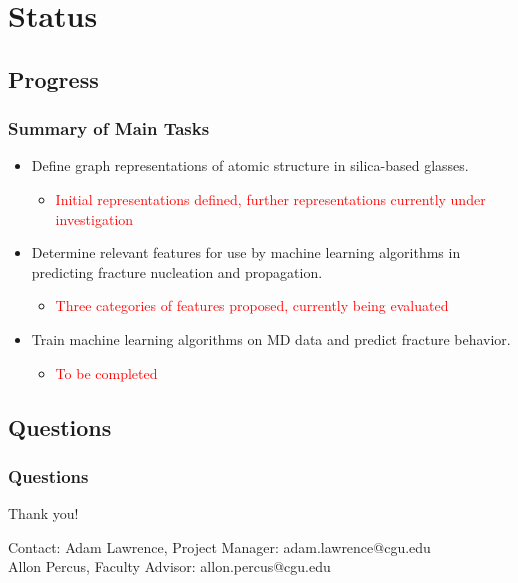 \section{Status}

\subsection{Progress}

\frame
{
\frametitle{Summary of Main Tasks}

    \begin{block}{}
    	\begin{itemize}
        \item Define graph representations of atomic structure in silica-based glasses.
        \begin{itemize}
		\item \textcolor{red}{Initial representations defined, further representations currently under investigation}
		\end{itemize}
        \item Determine relevant features for use by machine learning algorithms in predicting fracture nucleation and propagation.
        \begin{itemize}
		\item \textcolor{red}{Three categories of features proposed, currently being evaluated}
		\end{itemize}
        \item Train machine learning algorithms on MD data and predict fracture behavior.
        \begin{itemize}
		\item \textcolor{red}{To be completed}
		\end{itemize}
    	\end{itemize}
    \end{block}

}

\subsection{Questions}

\frame
{
\frametitle{Questions}

    { Thank you! \newline \newline  }

    \begin{block}{Contact:} 
Adam Lawrence, Project Manager: adam.lawrence@cgu.edu\\
Allon Percus, Faculty Advisor: allon.percus@cgu.edu \newline \newline
	\end{block}

}

